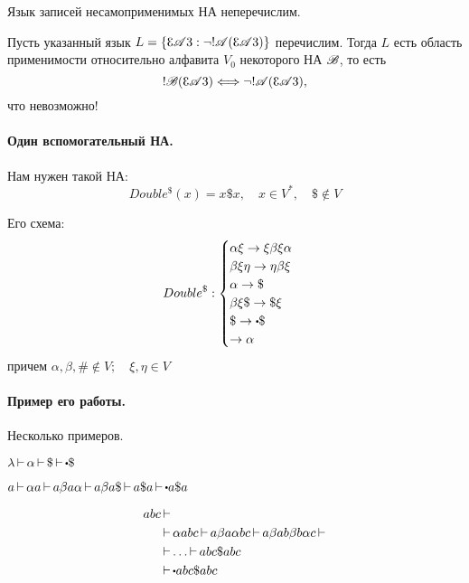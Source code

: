 

\title{}
\author{Козырнов Александр Дмитриевич, ИУ7-32Б}
\date{\today}



\begin{theorem}
Язык записей несамоприменимых НА неперечислим.
\end{theorem}

\begin{myproof}
    Пусть указанный язык $L = \{\zap{\scr{A}}: \lnot!\scr{A}(\zap{\scr{A}})\} $ перечислим.
    Тогда $L$ есть область применимости относительно алфавита  $V_0$ некоторого НА $\mathscr{B}$,
    то есть
    \[
        !\scr{B}(\zap{\scr{A}}) \Longleftrightarrow \lnot !\scr{A}(\zap{\scr{A}}),
    \]
    что невозможно!
\end{myproof}

\paragraph*{Один вспомогательный НА.}
Нам нужен такой НА:
\[
Double^{\$}(x) = x\$ x,\quad x \in V^{*},\quad \$ \not\in V
\]

Его схема:
\[
Double^{\$}: \begin{cases}
    \alpha\xi \to \xi\beta\xi\alpha\\
    \beta\xi\eta \to \eta\beta\xi\\
    \alpha \to \$\\
    \beta\xi\$ \to \$ \xi\\
    \$ \to \bigcdot \$\\
    \to \alpha\\
\end{cases}
\]
причем $\alpha,\beta,\# \not\in V; \quad \xi,\eta \in V$

\paragraph*{Пример его работы.} Несколько примеров.

 $\lambda \step \alpha \step \$ \step\bigcdot \$$

  $a \step \alpha a\step a\beta a\alpha \step a\beta a\$ \step a\$ a \step\bigcdot a\$ a$

\begin{align*}
    abc &\step\\
              &\step \alpha abc \step a\beta a\alpha bc \step a\beta ab\beta b\alpha c \step\\
              & \step \ldots \step abc\$ abc \\
              &\step\bigcdot abc\$ abc
\end{align*}


